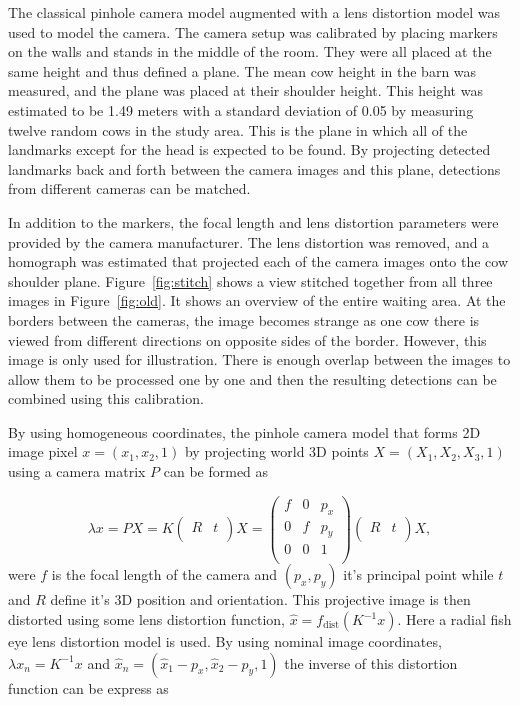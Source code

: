 \documentclass{IET}
\begin{document}
The classical pinhole camera model augmented with a lens distortion model was used to model the camera.
The camera setup was calibrated by placing markers on the walls and stands in the middle of the room. They were all placed at the same height and thus defined a plane. The mean cow height in the barn was measured, and the plane was placed at their shoulder height. This height was estimated to be 1.49 meters with a standard deviation of 0.05 by measuring twelve random cows in the study area.
This is the plane in which all of the landmarks except for the head is expected to be found. By projecting detected landmarks back and forth between the camera images and this plane, detections from different cameras can be matched.

In addition to the markers, the focal length and lens distortion parameters were provided by the camera manufacturer.
The lens distortion was removed, and a homograph was estimated that projected each of the camera images onto the cow shoulder plane. Figure~\ref{fig:stitch} shows a view stitched together from all three images in Figure~\ref{fig:old}. It shows an overview of the entire waiting area. At the borders between the cameras, the image becomes strange as one cow there is viewed from different directions on opposite sides of the border. However, this image is only used for illustration. There is enough overlap between the images to allow them to be processed one by one and then the resulting detections can be combined using this calibration.

By using homogeneous coordinates, the pinhole camera model that forms 2D image pixel $x=\left(x_1, x_2, 1\right)$ by projecting world 3D points $X=\left(X_1, X_2, X_3, 1\right)$ using a camera matrix $P$ can be formed as

\begin{equation}
	\lambda x = P X = K \left(
	\begin{array}{cc}
		R & t \\
	\end{array}
	\right) X = 
	\left(
	\begin{array}{ccc}
		f & 0 & p_x  \\
		0 & f & p_y  \\
		0 & 0 & 1  \\
	\end{array}
	\right)
	\left(
	\begin{array}{cc}
		R & t \\
	\end{array}
	\right) X,	
\end{equation} 
were $f$ is the focal length of the camera and $\left(p_x, p_y\right)$ it's principal point while $t$ and $R$  define it's 3D position and orientation. This projective image is then distorted using some lens distortion function, $\hat x = f_\text{dist}\left(K^{-1}x\right)$. Here a radial fish eye lens distortion model is used. By using nominal image coordinates, $\lambda x_n = K^{-1} x$ and $\hat x_n = \left(\hat x_1 - p_x, \hat x_2 - p_y, 1\right)$ the inverse of this distortion function can be express as 
\end{document}
